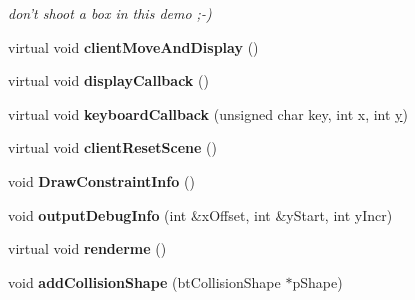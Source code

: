 \begin{DoxyCompactItemize}
\begin{DoxyCompactList}\small\item\em don't shoot a box in this demo ;-\/) \end{DoxyCompactList}\item 
\hypertarget{class_basic_demo_a57d3b919ccd45f452e087dce05a725a5}{virtual void {\bfseries client\+Move\+And\+Display} ()}\label{class_basic_demo_a57d3b919ccd45f452e087dce05a725a5}

\item 
\hypertarget{class_basic_demo_af966a5fdc7aa52b96258f5a2b3eb76ec}{virtual void {\bfseries display\+Callback} ()}\label{class_basic_demo_af966a5fdc7aa52b96258f5a2b3eb76ec}

\item 
\hypertarget{class_basic_demo_a599c352d5a216b845c19cefd43bd2cd8}{virtual void {\bfseries keyboard\+Callback} (unsigned char key, int x, int \hyperlink{_ice_utils_8h_aa7ffaed69623192258fb8679569ff9ba}{y})}\label{class_basic_demo_a599c352d5a216b845c19cefd43bd2cd8}

\item 
\hypertarget{class_basic_demo_a2d1384c39e1ed3053854371fc2335dcb}{virtual void {\bfseries client\+Reset\+Scene} ()}\label{class_basic_demo_a2d1384c39e1ed3053854371fc2335dcb}

\item 
\hypertarget{class_basic_demo_a09d6c90a68151fa3eb287e2ca2beb9eb}{void {\bfseries Draw\+Constraint\+Info} ()}\label{class_basic_demo_a09d6c90a68151fa3eb287e2ca2beb9eb}

\item 
\hypertarget{class_basic_demo_aca87fd9d16e5b538bf280f213fa40005}{void {\bfseries output\+Debug\+Info} (int \&x\+Offset, int \&y\+Start, int y\+Incr)}\label{class_basic_demo_aca87fd9d16e5b538bf280f213fa40005}

\item 
\hypertarget{class_basic_demo_abd31a168517dcdd2e98e9a7a00512d6b}{virtual void {\bfseries renderme} ()}\label{class_basic_demo_abd31a168517dcdd2e98e9a7a00512d6b}

\item 
\hypertarget{class_basic_demo_a06b28082cbe3bb5e98a6190cfd87e669}{void {\bfseries add\+Collision\+Shape} (bt\+Collision\+Shape $\ast$p\+Shape)}\label{class_basic_demo_a06b28082cbe3bb5e98a6190cfd87e669}

\end{DoxyCompactItemize}
